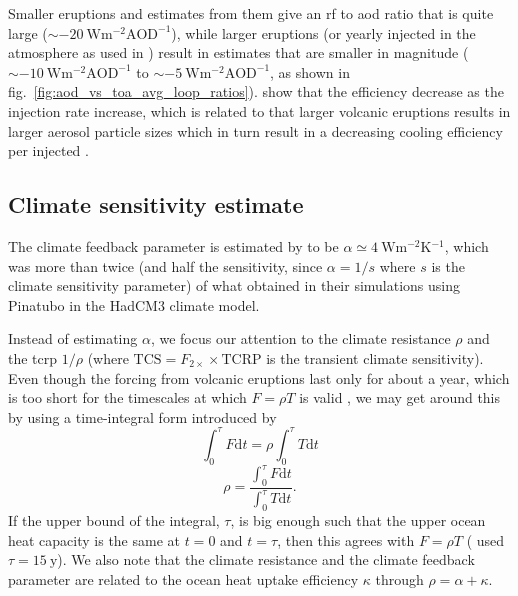 \documentclass{ametsocV6.1}
\newcommand{\iso}[1][i]{{#1}njected \ce{SO2}}
\begin{document}
Smaller eruptions and estimates from them give an \gls{rf} to \gls{aod} ratio that is
quite large (\(\sim \SI{-20}{\watt\metre^{-2}\mathrm{AOD}^{-1}}\)), while larger
eruptions (or yearly \iso{} in the atmosphere as used in \citet{niemeier2015}) result in
estimates that are smaller in magnitude (\(\sim
\SI{-10}{\watt\metre^{-2}\mathrm{AOD}^{-1}}\) to \(\sim
\SI{-5}{\watt\metre^{-2}\mathrm{AOD}^{-1}}\), as shown in
fig.~\ref{fig:aod_vs_toa_avg_loop_ratios}). \citet{niemeier2017} show that the
efficiency decrease as the injection rate increase, which is related to that larger
volcanic eruptions results in larger aerosol particle sizes which in turn result in a
decreasing cooling efficiency per \iso{} \citep{english2013, timmreck2018}.

\subsection{Climate sensitivity estimate}


The climate feedback parameter is estimated by \citet{jones2005} to be \(\alpha \simeq
\SI{4}{\watt\metre^{-2}\kelvin^{-1}}\), which was more than twice (and half the
sensitivity, since \(\alpha =1/s\) where \(s\) is the climate sensitivity parameter) of
what \citet{gregory2016} obtained in their simulations using Pinatubo in the HadCM3
climate model.

Instead of estimating \(\alpha \), we focus our attention to the climate resistance
\(\rho \) and the \gls{tcrp} \(1/\rho\) (where \(\mathrm{TCS}=F_{2\times}\times
\mathrm{TCRP}\) is the transient climate sensitivity). Even though the forcing from
volcanic eruptions last only for about a year, which is too short for the timescales at
which \(F=\rho T\) is valid \citep{gregory2016}, we may get around this by using a
time-integral form introduced by \citet{merlis2014}
\begin{equation}
  \int_0^{\tau}F \mathrm{d}t=\rho\int_{0}^{\tau}T \mathrm{d}t
\end{equation}
\begin{equation}
  \rho=\frac{\int_0^{\tau}F \mathrm{d}t}{\int_{0}^{\tau}T \mathrm{d}t}.
  \label{eq:climate-resistance}
\end{equation}
%
If the upper bound of the integral, \(\tau \), is big enough such that the upper ocean
heat capacity is the same at \(t=0\) and \(t=\tau \), then this agrees with \(F=\rho T\)
\citep{gregory2016} (\citet{merlis2014} used \(\tau =\SI{15}{\mathrm{y}}\)). We also
note that the climate resistance and the climate feedback parameter are related to the
ocean heat uptake efficiency \(\kappa \) through \(\rho =\alpha +\kappa \).
\end{document}
